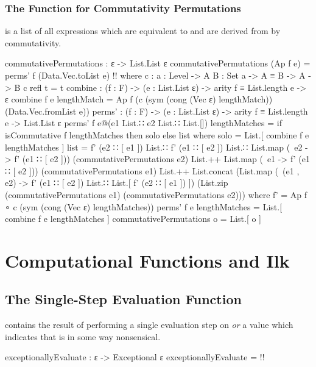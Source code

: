 \documentclass{report}
\begin{document}
\subsection{The Function for Commutativity Permutations}
  is a list of all expressions which are equivalent to  and are derived from  by commutativity.

\begin{code}
commutativePermutations : ε -> List.List ε
commutativePermutations (Ap f e) = perms' f (Data.Vec.toList e) {!!}
  where
  c : {a : Level} -> {A B : Set a} -> A ≡ B -> A -> B
  c refl t = t
  combine : (f : F) -> (e : List.List ε) -> arity f ≡ List.length e -> ε
  combine f e lengthMatch = Ap f (c (sym (cong (Vec ε) lengthMatch))
                                    (Data.Vec.fromList e))
  perms' : (f : F) -> (e : List.List ε) -> arity f ≡ List.length e -> List.List ε
  perms' f e@(e1 List.∷ e2 List.∷ List.[]) lengthMatches =
    if isCommutative f lengthMatches then solo else list
    where
    solo = List.[ combine f e lengthMatches ]
    list =
      f' (e2 ∷ [ e1 ]) List.∷ f' (e1 ∷ [ e2 ]) List.∷
      List.map (\ e2 -> f' (e1 ∷ [ e2 ])) (commutativePermutations e2) List.++
      List.map (\ e1 -> f' (e1 ∷ [ e2 ])) (commutativePermutations e1) List.++
      List.concat (List.map (\ (e1 , e2) -> f' (e1 ∷ [ e2 ]) List.∷
                                            List.[ f' (e2 ∷ [ e1 ]) ])
                            (List.zip (commutativePermutations e1)
                                      (commutativePermutations e2)))
      where f' = Ap f ∘ c (sym (cong (Vec ε) lengthMatches))
  perms' f e lengthMatches = List.[ combine f e lengthMatches ]
commutativePermutations o = List.[ o ]
\end{code}

\chapter{Computational Functions and Ilk}

\section{The Single-Step Evaluation Function}
  contains the result of performing a single evaluation step on  \emph{or} a value which indicates that  is in some way nonsensical.

\begin{code}
exceptionallyEvaluate : ε -> Exceptional ε
exceptionallyEvaluate = {!!}
\end{code}
\end{document}

